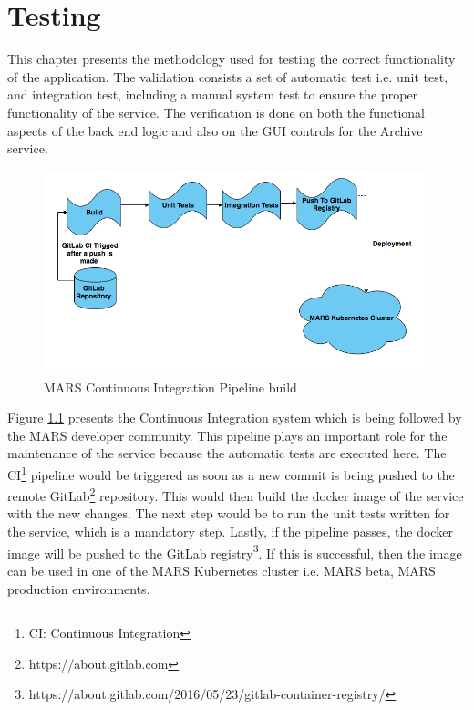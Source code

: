 \chapter{Testing}
\label{chap:testing}
This chapter presents the methodology used for testing the correct functionality of the application. The validation consists a set of automatic test i.e.
unit test, and integration test, including a manual system test to ensure the proper functionality of the service. The verification is done on both the functional
aspects of the back end logic and also on the GUI controls for the Archive service.

\begin{figure}[H]
    \centering \includegraphics[scale=0.5]{grafiken/CIbuild.png}
    \caption{MARS Continuous Integration Pipeline build}
    \label{fig:CIbuild}
\end{figure}

Figure \ref{fig:CIbuild} presents the Continuous Integration system which is being followed by the MARS developer community. This pipeline plays an important role
for the maintenance of the service because the automatic tests are executed here.
The CI\footnote{CI: Continuous Integration} pipeline would be triggered as soon as a new commit is being pushed to the remote 
GitLab\footnote{https://about.gitlab.com} repository. This would then build the docker image of the service with the new changes. The next step would be to
run the unit tests written for the service, which is a mandatory step. Lastly, if the pipeline passes, the docker image will be pushed
to the GitLab registry\footnote{https://about.gitlab.com/2016/05/23/gitlab-container-registry/}. If this is successful, then the image can be used in one of 
the MARS Kubernetes cluster i.e. MARS beta, MARS production environments. 




